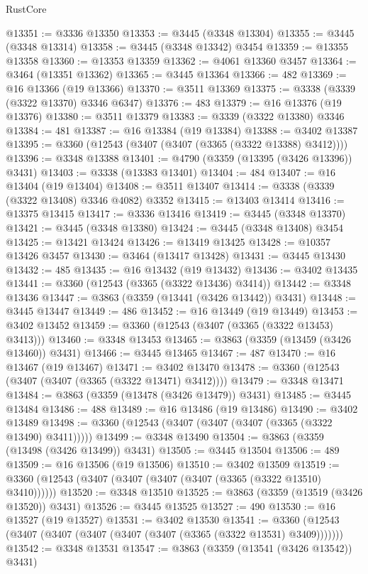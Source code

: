 \begin{lexlean}{RustCore}
\begin{coremodule}
@13351 := @3336 @13350
@13353 := @3445 (@3348 @13304)
@13355 := @3445 (@3348 @13314)
@13358 := @3445 (@3348 @13342) @3454
@13359 := @13355 @13358
@13360 := @13353 @13359
@13362 := @4061 @13360 @3457
@13364 := @3464 (@13351 @13362)
@13365 := @3445 @13364
@13366 := 482
@13369 := @16 @13366 (@19 @13366)
@13370 := @3511 @13369
@13375 := @3338 (@3339 (@3322 @13370) @3346 @6347)
@13376 := 483
@13379 := @16 @13376 (@19 @13376)
@13380 := @3511 @13379
@13383 := @3339 (@3322 @13380) @3346
@13384 := 481
@13387 := @16 @13384 (@19 @13384)
@13388 := @3402 @13387
@13395 := @3360 (@12543 (@3407 (@3407 (@3365 (@3322 @13388) @3412))))
@13396 := @3348 @13388
@13401 := @4790 (@3359 (@13395 (@3426 @13396)) @3431)
@13403 := @3338 (@13383 @13401)
@13404 := 484
@13407 := @16 @13404 (@19 @13404)
@13408 := @3511 @13407
@13414 := @3338 (@3339 (@3322 @13408) @3346 @4082) @3352
@13415 := @13403 @13414
@13416 := @13375 @13415
@13417 := @3336 @13416
@13419 := @3445 (@3348 @13370)
@13421 := @3445 (@3348 @13380)
@13424 := @3445 (@3348 @13408) @3454
@13425 := @13421 @13424
@13426 := @13419 @13425
@13428 := @10357 @13426 @3457
@13430 := @3464 (@13417 @13428)
@13431 := @3445 @13430
@13432 := 485
@13435 := @16 @13432 (@19 @13432)
@13436 := @3402 @13435
@13441 := @3360 (@12543 (@3365 (@3322 @13436) @3414))
@13442 := @3348 @13436
@13447 := @3863 (@3359 (@13441 (@3426 @13442)) @3431)
@13448 := @3445 @13447
@13449 := 486
@13452 := @16 @13449 (@19 @13449)
@13453 := @3402 @13452
@13459 := @3360 (@12543 (@3407 (@3365 (@3322 @13453) @3413)))
@13460 := @3348 @13453
@13465 := @3863 (@3359 (@13459 (@3426 @13460)) @3431)
@13466 := @3445 @13465
@13467 := 487
@13470 := @16 @13467 (@19 @13467)
@13471 := @3402 @13470
@13478 := @3360 (@12543 (@3407 (@3407 (@3365 (@3322 @13471) @3412))))
@13479 := @3348 @13471
@13484 := @3863 (@3359 (@13478 (@3426 @13479)) @3431)
@13485 := @3445 @13484
@13486 := 488
@13489 := @16 @13486 (@19 @13486)
@13490 := @3402 @13489
@13498 := @3360 (@12543 (@3407 (@3407 (@3407 (@3365 (@3322 @13490) @3411)))))
@13499 := @3348 @13490
@13504 := @3863 (@3359 (@13498 (@3426 @13499)) @3431)
@13505 := @3445 @13504
@13506 := 489
@13509 := @16 @13506 (@19 @13506)
@13510 := @3402 @13509
@13519 := @3360 (@12543 (@3407 (@3407 (@3407 (@3407 (@3365 (@3322 @13510) @3410))))))
@13520 := @3348 @13510
@13525 := @3863 (@3359 (@13519 (@3426 @13520)) @3431)
@13526 := @3445 @13525
@13527 := 490
@13530 := @16 @13527 (@19 @13527)
@13531 := @3402 @13530
@13541 := @3360 (@12543 (@3407 (@3407 (@3407 (@3407 (@3407 (@3365 (@3322 @13531) @3409)))))))
@13542 := @3348 @13531
@13547 := @3863 (@3359 (@13541 (@3426 @13542)) @3431)

\end{coremodule}
\end{lexlean}
